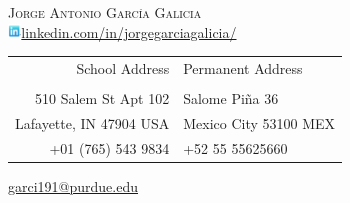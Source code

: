 \documentclass[letterpaper,10pt]{article}
\begin{document}
\newcommand{\qed}{\hfill \ensuremath{\Box}}
\setlength{\topmargin}{-1.5cm}
\setlength{\footskip}{55pt}
\renewcommand{\headrulewidth}{0pt} 
\renewcommand{\footrulewidth}{0pt}
\newcommand{\comillas	}[1]{``#1''}
\setlength{\parindent}{0cm}

\begin{minipage}{0.45\textwidth} 
\begin{center}
\textsc{\LARGE{Jorge Antonio Garc\'{i}a Galicia}} \\
\includegraphics[height = 10pt]{icons/linkedin.jpg}\href{http://www.linkedin.com/in/jorgegarciagalicia}{linkedin.com/in/jorgegarciagalicia/} 
\end{center}
\end{minipage}
\begin{minipage}{0.60\textwidth}
\begin{center}
\begin{tabular}{r|l}
School Address &  Permanent Address \\
&\\
510 Salem St Apt 102 & Salome Pi\~{n}a 36 \\
Lafayette, IN 47904 USA & Mexico City 53100 MEX \\
+01 (765) 543 9834 & +52 55 55625660 \\
\end{tabular} 
\smallskip

\hspace*{0.1cm}\href{mailto:garci191@purdue.edu}{garci191@purdue.edu} 
\end{center}
\end{minipage}\\
\bigskip
\end{document}
